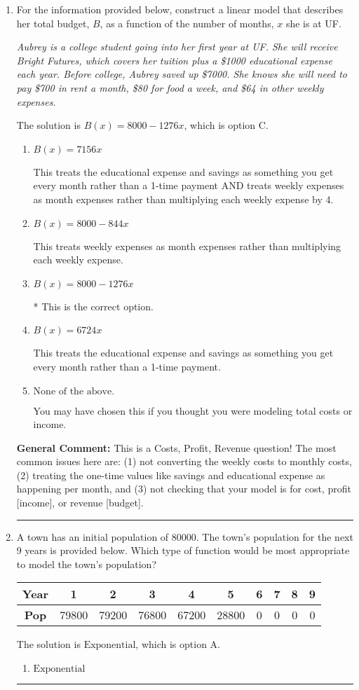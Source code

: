\documentclass{extbook}[14pt]
\newcommand{\litem}[1]{\item #1

\rule{\textwidth}{0.4pt}}
\begin{document}
\begin{enumerate}\litem{
For the information provided below, construct a linear model that describes her total budget, $B$, as a function of the number of months, $x$ she is at UF.

\begin{center}
    \textit{ Aubrey is a college student going into her first year at UF. She will receive Bright Futures, which covers her tuition plus a \$1000 educational expense each year. Before college, Aubrey saved up \$7000. She knows she will need to pay \$700 in rent a month, \$80 for food a week, and \$64 in other weekly expenses. }
\end{center}
The solution is \( B(x) = 8000 - 1276 x \), which is option C.\begin{enumerate}[label=\Alph*.]
\item \( B(x) = 7156 x \)

This treats the educational expense and savings as something you get every month rather than a 1-time payment AND treats weekly expenses as month expenses rather than multiplying each weekly expense by 4.
\item \( B(x) = 8000 - 844 x \)

This treats weekly expenses as month expenses rather than multiplying each weekly expense.
\item \( B(x) = 8000 - 1276 x \)

* This is the correct option.
\item \( B(x) = 6724 x \)

This treats the educational expense and savings as something you get every month rather than a 1-time payment.
\item \( \text{None of the above.} \)

You may have chosen this if you thought you were modeling total costs or income.
\end{enumerate}

\textbf{General Comment:} This is a Costs, Profit, Revenue question! The most common issues here are: (1) not converting the weekly costs to monthly costs, (2) treating the one-time values like savings and educational expense as happening per month, and (3) not checking that your model is for cost, profit [income], or revenue [budget].
}
\litem{
A town has an initial population of 80000. The town's population for the next 9 years is provided below. Which type of function would be most appropriate to model the town's population?


\begin{tabular}{c|c|c|c|c|c|c|c|c|c}
\textbf{Year} &1 &2 &3 &4 &5 &6 &7 &8 &9\tabularnewline \hline
\textbf{Pop} &79800 &79200 &76800 &67200 &28800 &0 &0 &0 &0\end{tabular}The solution is \( \text{Exponential} \), which is option A.\begin{enumerate}[label=\Alph*.]
\item \( \text{Exponential} \)


\end{enumerate}}
\end{enumerate}
\end{document}
